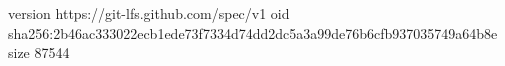 version https://git-lfs.github.com/spec/v1
oid sha256:2b46ac333022ecb1ede73f7334d74dd2dc5a3a99de76b6cfb937035749a64b8e
size 87544
